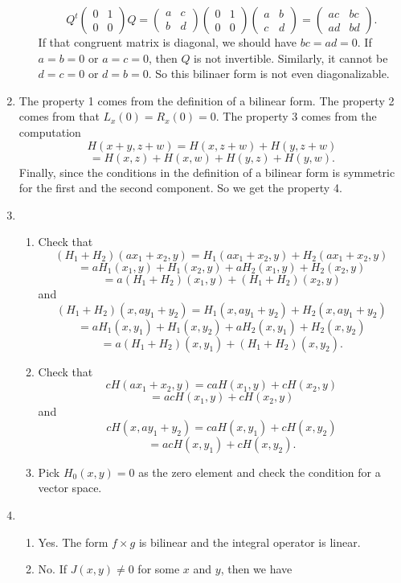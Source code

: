 \begin{enumerate}
\begin{enumerate}
\[Q^t\begin{pmatrix}0&1\\0&0\end{pmatrix}Q=\begin{pmatrix}a&c\\b&d\end{pmatrix}\begin{pmatrix}0&1\\0&0\end{pmatrix}\begin{pmatrix}a&b\\c&d\end{pmatrix}=\begin{pmatrix}ac&bc\\ad&bd\end{pmatrix}.\]
If that congruent matrix is diagonal, we should have $bc=ad=0$. If $a=b=0$ or $a=c=0$, then $Q$ is not invertible. Similarly, it cannot be $d=c=0$ or $d=b=0$. So this bilinaer form is not even diagonalizable.
\end{enumerate}
\item The property 1 comes from the definition of a bilinear form. The property 2 comes from that $L_x(0)=R_x(0)=0$. The property 3 comes from the computation 
\[H(x+y,z+w)=H(x,z+w)+H(y,z+w)\]
\[=H(x,z)+H(x,w)+H(y,z)+H(y,w).\]
Finally, since the conditions in the definition of a bilinear form is symmetric for the first and the second component. So we get the property 4.
\item \begin{enumerate}
\item Check that 
\[(H_1+H_2)(ax_1+x_2,y)=H_1(ax_1+x_2,y)+H_2(ax_1+x_2,y)\]
\[=aH_1(x_1,y)+H_1(x_2,y)+aH_2(x_1,y)+H_2(x_2,y)\]
\[=a(H_1+H_2)(x_1,y)+(H_1+H_2)(x_2,y)\]
and 
\[(H_1+H_2)(x,ay_1+y_2)=H_1(x,ay_1+y_2)+H_2(x,ay_1+y_2)\]
\[=aH_1(x,y_1)+H_1(x,y_2)+aH_2(x,y_1)+H_2(x,y_2)\]
\[=a(H_1+H_2)(x,y_1)+(H_1+H_2)(x,y_2).\]
\item Check that 
\[cH(ax_1+x_2,y)=caH(x_1,y)+cH(x_2,y)\]
\[=acH(x_1,y)+cH(x_2,y)\]
and 
\[cH(x,ay_1+y_2)=caH(x,y_1)+cH(x,y_2)\]
\[=acH(x,y_1)+cH(x,y_2).\]
\item Pick $H_0(x,y)=0$ as the zero element and check the condition for a vector space.
\end{enumerate}
\item \begin{enumerate}
\item Yes. The form $f\times g$ is bilinear and the integral operator is linear.
\item No. If $J(x,y)\neq 0$ for some $x$ and $y$, then we have 

\end{enumerate}
\end{enumerate}
